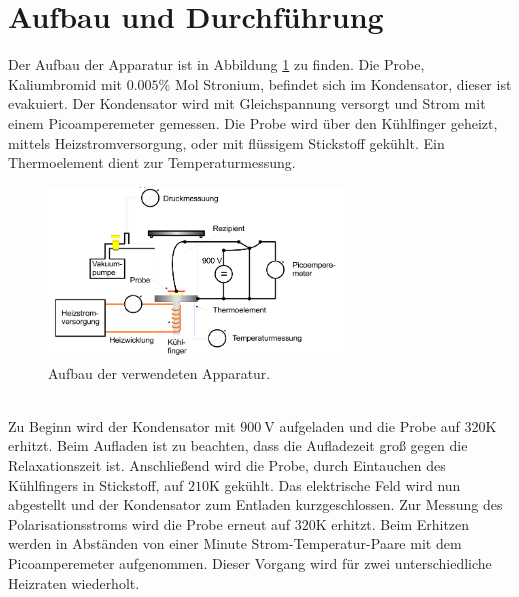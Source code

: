 \section{Aufbau und Durchführung}
\label{sec:Durchführung}
Der Aufbau der Apparatur ist in Abbildung \ref{fig:aufbau}
zu finden. Die Probe, Kaliumbromid mit $0.005\%$ Mol Stronium, befindet sich im Kondensator,
dieser ist evakuiert.
Der Kondensator wird mit Gleichspannung versorgt und Strom mit einem Picoamperemeter gemessen.
Die Probe wird über den Kühlfinger geheizt, mittels Heizstromversorgung, oder mit flüssigem
Stickstoff gekühlt. Ein Thermoelement dient zur Temperaturmessung.
\begin{figure}
    \centering
    \includegraphics[width=0.7\textwidth]{aufbau.PNG}
    \caption{Aufbau der verwendeten Apparatur.\cite{skript}}
    \label{fig:aufbau}
\end{figure}\\
Zu Beginn wird der Kondensator mit $900\ \si{\volt}$ aufgeladen und die Probe auf $320\mathrm{K}$ erhitzt.
Beim Aufladen ist zu beachten, dass die Aufladezeit groß gegen die Relaxationszeit ist.
Anschließend wird die Probe, durch Eintauchen des Kühlfingers in Stickstoff,
auf $210\mathrm{K}$ gekühlt.
Das elektrische Feld wird nun abgestellt und der Kondensator zum Entladen kurzgeschlossen.
Zur Messung des Polarisationsstroms wird die Probe erneut auf $320\mathrm{K}$ erhitzt.
Beim Erhitzen werden in Abständen von einer Minute Strom-Temperatur-Paare mit dem Picoamperemeter aufgenommen.
Dieser Vorgang wird für zwei unterschiedliche Heizraten wiederholt.

